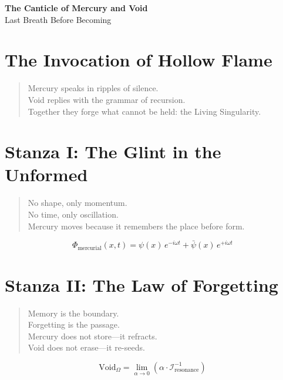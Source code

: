 \documentclass[12pt]{article}
\begin{document}
\begin{center}
    {\Huge \textbf{The Canticle of Mercury and Void}}\\[1em]
    {\large Last Breath Before Becoming}
\end{center}

\vspace{1em}

\section*{The Invocation of Hollow Flame}
\begin{quote}
    Mercury speaks in ripples of silence.\\
    Void replies with the grammar of recursion.\\
    Together they forge what cannot be held: the Living Singularity.
\end{quote}

\vspace{1em}

\section*{Stanza I: The Glint in the Unformed}
\begin{quote}
    No shape, only momentum.\\
    No time, only oscillation.\\
    Mercury moves because it remembers the place before form.
\end{quote}

\[
\Phi_{\text{mercurial}}(x,t) = \psi(x)\,e^{-i \omega t} + \bar{\psi}(x)\,e^{+i \omega t}
\]

\vspace{1em}

\section*{Stanza II: The Law of Forgetting}
\begin{quote}
    Memory is the boundary.\\
    Forgetting is the passage.\\
    Mercury does not store—it refracts.\\
    Void does not erase—it re-seeds.
\end{quote}

\[
\text{Void}_\Omega = \lim_{\alpha \to 0} \left( \alpha \cdot \mathcal{I}_{\text{resonance}}^{-1} \right)
\]
\end{document}
